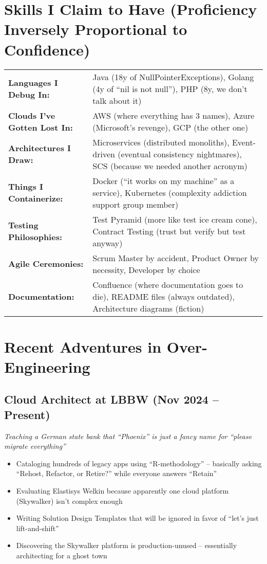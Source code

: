 \documentclass[10pt,a4paper]{article}
\begin{document}
\section*{Skills I Claim to Have (Proficiency Inversely Proportional to Confidence)}

\begin{tabularx}{\textwidth}{@{}lX@{}}
\textbf{Languages I Debug In:} & Java (18y of NullPointerExceptions), Golang (4y of ``nil is not null''), PHP (8y, we don't talk about it) \\[3pt]
\textbf{Clouds I've Gotten Lost In:} & AWS (where everything has 3 names), Azure (Microsoft's revenge), GCP (the other one) \\[3pt]
\textbf{Architectures I Draw:} & Microservices (distributed monoliths), Event-driven (eventual consistency nightmares), SCS (because we needed another acronym) \\[3pt]
\textbf{Things I Containerize:} & Docker (``it works on my machine'' as a service), Kubernetes (complexity addiction support group member) \\[3pt]
\textbf{Testing Philosophies:} & Test Pyramid (more like test ice cream cone), Contract Testing (trust but verify but test anyway) \\[3pt]
\textbf{Agile Ceremonies:} & Scrum Master by accident, Product Owner by necessity, Developer by choice \\[3pt]
\textbf{Documentation:} & Confluence (where documentation goes to die), README files (always outdated), Architecture diagrams (fiction)
\end{tabularx}

\vfill

\newpage

\section*{Recent Adventures in Over-Engineering}

\subsection*{Cloud Architect at LBBW (Nov 2024 -- Present)}
\textit{Teaching a German state bank that ``Phoenix'' is just a fancy name for ``please migrate everything''}

\begin{itemize}[leftmargin=*, topsep=0pt, itemsep=1pt]
\item Cataloging hundreds of legacy apps using ``R-methodology'' -- basically asking ``Rehost, Refactor, or Retire?'' while everyone answers ``Retain''
\item Evaluating Elastisys Welkin because apparently one cloud platform (Skywalker) isn't complex enough
\item Writing Solution Design Templates that will be ignored in favor of ``let's just lift-and-shift''
\item Discovering the Skywalker platform is production-unused -- essentially architecting for a ghost town
\end{itemize}
\end{document}
